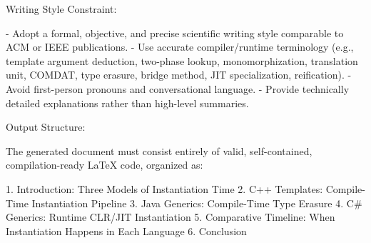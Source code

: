 \documentclass[11pt]{report}
\begin{document}
\begin{PromptVerbatim}
Writing Style Constraint:

- Adopt a formal, objective, and precise scientific writing style
  comparable to ACM or IEEE publications.
- Use accurate compiler/runtime terminology (e.g., template argument
  deduction, two-phase lookup, monomorphization, translation unit,
  COMDAT, type erasure, bridge method, JIT specialization, reification).
- Avoid first-person pronouns and conversational language.
- Provide technically detailed explanations rather than high-level
  summaries.

Output Structure:

The generated document must consist entirely of valid, self-contained,
compilation-ready LaTeX code, organized as:

1. Introduction: Three Models of Instantiation Time
2. C++ Templates: Compile-Time Instantiation Pipeline
3. Java Generics: Compile-Time Type Erasure
4. C# Generics: Runtime CLR/JIT Instantiation
5. Comparative Timeline: When Instantiation Happens in Each Language
6. Conclusion
\end{PromptVerbatim}
\end{document}
